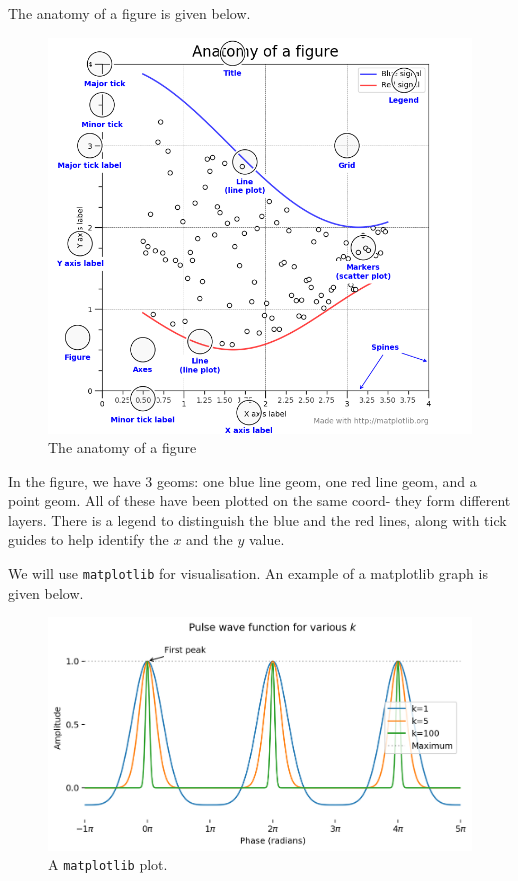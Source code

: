 \documentclass[a4paper, openany]{memoir}
\begin{document}
The anatomy of a figure is given below.
\begin{figure}[H]
    \centering
    \includegraphics[scale=0.5]{src/2.3 anatomy of a figure.png}
    \caption{The anatomy of a figure}
\end{figure}
\noindent In the figure, we have 3 geoms: one blue line geom, one red line geom, and a point geom. All of these have been plotted on the same coord- they form different layers. There is a legend to distinguish the blue and the red lines, along with tick guides to help identify the $x$ and the $y$ value.

We will use \texttt{matplotlib} for visualisation. An example of a matplotlib graph is given below.
\begin{figure}[H]
    \centering
    \includegraphics[scale=0.55]{src/2.4 example matplotlib plot.png}
    \caption{A \texttt{matplotlib} plot.}
\end{figure}
\end{document}

